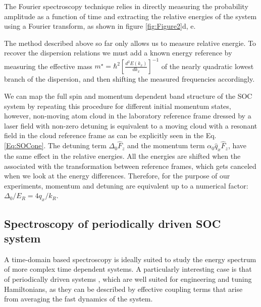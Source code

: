 The Fourier spectroscopy technique relies in directly measuring the probability amplitude as a function of time and extracting the relative energies of the system using a Fourier transform, as shown in figure \ref{fig:Figure2}d, e.

The method described above so far only allows us to measure relative energie. To recover the dispersion relations we must add a known energy reference by measuring the effective mass $m^{\star} = \hbar^2[\frac{d^2E(k_x)}{dk_x}]^{-1}$ of the nearly quadratic lowest branch of the dispersion, and then shifting the measured frequencies accordingly. 

We can map the full spin and momentum dependent band structure of the SOC system by repeating this procedure for different initial momentum states, however, non-moving atom cloud in the laboratory reference frame dressed by a laser field with non-zero detuning is equivalent to a moving cloud with a resonant field in the cloud reference frame as can be explicitly seen in the Eq. \ref{Eq:SOCone}. The detuning term $\Delta_0\hat{F}_z$ and the momentum term $\alpha_0\hat{q}_x\hat{F}_z$, have the same effect in the relative energies. All the energies are shifted when the  associated with the transformation between reference frames, which gets canceled when we look at the energy differences. Therefore, for the purpose of our experiments, momentum and detuning are equivalent up to a numerical factor: $\Delta_0/E_R=4q_x/k_R$.%

\subsection{Spectroscopy of periodically driven SOC system}

A time-domain based spectroscopy is ideally suited to study the energy spectrum of more complex time dependent systems. A particularly interesting case is that of periodically driven systems \cite{jimenez-garcia_tunable_2015,eckardt_superfluid-insulator_2005,goldman_periodically_2014}, which are well suited for engineering and tuning Hamiltonians, as they can be described by effective coupling terms that arise from averaging the fast dynamics of the system. %

